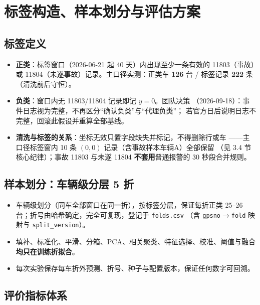 \section{标签构造、样本划分与评估方案}

\subsection{标签定义}

\begin{itemize}
  \item \textbf{正类}：标签窗口（2026-06-21 起 40 天）内出现至少一条有效的
        11803（事故）或 11804（未遂事故）记录。主口径实测：正类车
        \textbf{126} 台 / 标签记录 \textbf{222} 条（清洗前后守恒）。
  \item \textbf{负类}：窗口内无 11803/11804 记录即记 $y=0$。团队决策
        （2026-09-18）：事件日志视为完整，不再区分“确认负类”与“代理负类”；
        若官方日后说明日志不完整，回滚此假设并重算全部基线。
  \item \textbf{清洗与标签的关系}：坐标无效只置字段缺失并标记，不得删除行或车
        ——主口径标签窗内 10 条 $(0,0)$ 记录（含事故样本车辆A）全部保留
        （见 3.4 节核心纪律）；事故 11803 与未遂 11804 \textbf{不套用}普通报警的
        30 秒段合并规则。
\end{itemize}

\subsection{样本划分：车辆级分层 5 折}

\begin{itemize}
  \item 车辆级划分（同车全部窗口在同一折），按标签分层，保证每折正类
        25--26 台；折号由哈希确定，完全可复现，登记于 \texttt{folds.csv}
        （含 \texttt{gpsno}$\to$\texttt{fold} 映射与 \texttt{split\_version}）。
  \item 填补、标准化、平滑、分箱、PCA、相关聚类、特征选择、校准、阈值与融合
        \textbf{均只在训练折拟合}。
  \item 每次实验保存每车折外预测、折号、种子与配置版本，保证任何数字可回溯。
\end{itemize}

\subsection{评价指标体系}

